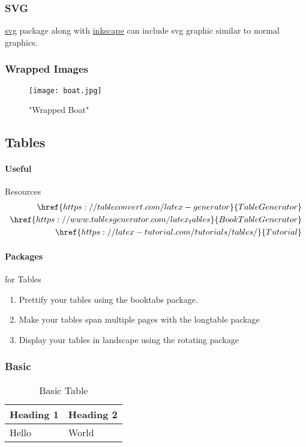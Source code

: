 \documentclass{report}[a4paper,12pt] %
\begin{document}
\subsubsection{SVG}
\href{https://www.ctan.org/pkg/svg}{svg} package along with \href{https://wiki.archlinux.org/title/Inkscape}{inkscape}
can include svg graphic similar to normal graphics.



\subsubsection{Wrapped Images}
\begin{wrapfigure}{r}{0.5\linewidth}
  \centering
  \texttt{[image: boat.jpg]}
  \caption{"Wrapped Boat"}
  \label{fig:wboat}
\end{wrapfigure}
\lipsum[1]

\subsection{Tables}

\paragraph{Useful} Resources
\begin{align*}
  \href{https://tableconvert.com/latex-generator}{Table Generator}\\
  \href{https://www.tablesgenerator.com/latex_tables}{Book Table Generator}\\
  \href{https://latex-tutorial.com/tutorials/tables/}{Tutorial}
\end{align*}

\paragraph*{Packages} for Tables
\begin{enumerate}
  \item Prettify your tables using the booktabs package.
  \item Make your tables span multiple pages with the longtable package
  \item Display your tables in landscape using the rotating package  
\end{enumerate}

\subsubsection{Basic}
\begin{table}[!h]
  \centering
  \caption{Basic Table}
  \begin{tabular}{|l|l|}
  \hline
      \textbf{Heading 1} & \textbf{Heading 2} \\ \hline
      Hello & World \\ \hline
  \end{tabular}
  \label{tab:basic}
\end{table}
\end{document}
